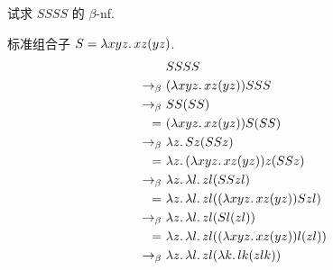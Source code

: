 \begin{problem}
试求 $SSSS$ 的 $\beta$-nf.
\end{problem}

\begin{solution}
标准组合子 $S = \lambda {xyz}.\,{xz(yz)}$.
\begin{align*}
~ & S S S S \\
\to_{\beta} ~ & (\lambda {xyz}.\,{xz(yz)}) S S S \\
\to_{\beta} ~ & S S (S S) \\
= ~ & (\lambda {xyz}.\,{xz(yz)}) S (S S) \\
\to_{\beta} ~ & \lambda {z}.\,{S z (S S z)} \\
= ~ & \lambda {z}.\,{(\lambda {xyz}.\,{xz(yz)}) z (S S z)} \\
\to_{\beta} ~ & \lambda {z}.\,{\lambda {l}.\,{zl(S S z l)}} \\
= ~ & \lambda {z}.\,{\lambda {l}.\,{zl((\lambda {xyz}.\,{xz(yz)})Szl)}} \\
\to_{\beta} ~ & \lambda {z}.\,{\lambda {l}.\,{zl(Sl(zl))}} \\
= ~ & \lambda {z}.\,{\lambda {l}.\,{zl((\lambda {xyz}.\,{xz(yz)})l(zl))}} \\
\to_{\beta} ~ & \lambda {z}.\,{\lambda {l}.\,{zl(\lambda {k}.\,{lk(zlk)})}}
\end{align*}

\end{solution}
